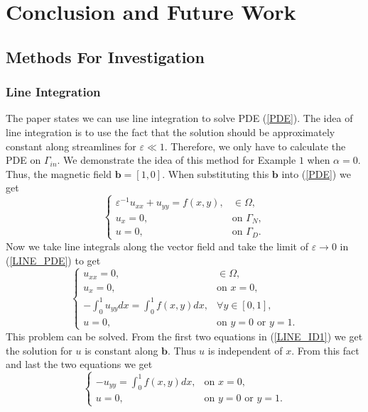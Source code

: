 \documentclass[12pt]{ociamthesis}
\begin{document}
\chapter{Conclusion and Future Work}

\section{Methods For Investigation}

\subsection{Line Integration}
The paper \cite{LINE_INT} states we can use line integration to solve PDE (\ref{PDE}).  The idea of line integration is to use the fact that the solution should be approximately constant along streamlines for $\varepsilon \ll 1$. Therefore, we only have to calculate the PDE on $\Gamma_{in}$. We demonstrate the idea of this method for Example $1$ when $\alpha=0$. Thus, the magnetic field $\mathbf{b} = [1, 0]$. When substituting this $\mathbf{b}$ into (\ref{PDE}) we get 
\begin{equation} \label{LINE_PDE}
\begin{cases}
\varepsilon^{-1}u_{xx} + u_{yy} = f(x,y), &\in \Omega,\\
u_x = 0, &\text{on } \Gamma_{N},\\
u = 0, &\text{on } \Gamma_{D}.
\end{cases}
\end{equation}
Now we take line integrals along the vector field and take the limit of $\varepsilon \rightarrow 0$ in (\ref{LINE_PDE}) to get
\begin{equation} \label{LINE_ID1}
\begin{cases}
u_{xx} = 0, &\in \Omega,\\
u_{x} = 0, & \text{on }x=0,\\
-\int_0^1 u_{yy} dx = \int_0^1f(x,y)dx, &\forall y \in [0,1],\\
u = 0, &\text{on } y=0 \text{ or } y=1.
\end{cases}
\end{equation}
This problem can be solved. From the first two equations in (\ref{LINE_ID1}) we get the solution for $u$ is constant along $\mathbf{b}$. Thus $u$ is independent of $x$. From this fact and last the two equations we get
\begin{equation}
\begin{cases}
-u_{yy} =\int_0^1 f(x, y) dx, &\text{on } x=0,\\
u = 0, &\text{on } y=0 \text{ or } y=1.
\end{cases}
\end{equation}
\end{document}
